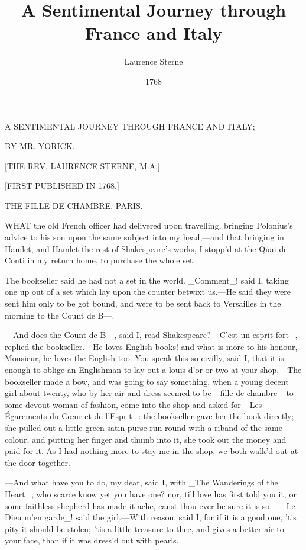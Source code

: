 \documentclass[twoside]{article}
\title{A Sentimental Journey through France and Italy}
\author{Laurence Sterne}
\date{1768}
\begin{document}
\def\vol{II}




                                    A
                           SENTIMENTAL JOURNEY
                                 THROUGH
                            FRANCE AND ITALY;


                              BY MR. YORICK.

                     [THE REV. LAURENCE STERNE, M.A.]

                        [FIRST PUBLISHED IN 1768.]





THE FILLE DE CHAMBRE.
PARIS.


WHAT the old French officer had delivered upon travelling, bringing
Polonius’s advice to his son upon the same subject into my head,—and that
bringing in Hamlet, and Hamlet the rest of Shakespeare’s works, I stopp’d
at the Quai de Conti in my return home, to purchase the whole set.

The bookseller said he had not a set in the world.  _Comment_! said I,
taking one up out of a set which lay upon the counter betwixt us.—He said
they were sent him only to be got bound, and were to be sent back to
Versailles in the morning to the Count de B—.

—And does the Count de B—, said I, read Shakespeare?  _C’est un esprit
fort_, replied the bookseller.—He loves English books! and what is more
to his honour, Monsieur, he loves the English too.  You speak this so
civilly, said I, that it is enough to oblige an Englishman to lay out a
louis d’or or two at your shop.—The bookseller made a bow, and was going
to say something, when a young decent girl about twenty, who by her air
and dress seemed to be _fille de chambre_ to some devout woman of
fashion, come into the shop and asked for _Les Égarements du Cœur et de
l’Esprit_: the bookseller gave her the book directly; she pulled out a
little green satin purse run round with a riband of the same colour, and
putting her finger and thumb into it, she took out the money and paid for
it.  As I had nothing more to stay me in the shop, we both walk’d out at
the door together.

—And what have you to do, my dear, said I, with _The Wanderings of the
Heart_, who scarce know yet you have one? nor, till love has first told
you it, or some faithless shepherd has made it ache, canst thou ever be
sure it is so.—_Le Dieu m’en garde_! said the girl.—With reason, said I,
for if it is a good one, ’tis pity it should be stolen; ’tis a little
treasure to thee, and gives a better air to your face, than if it was
dress’d out with pearls.
\end{document}
